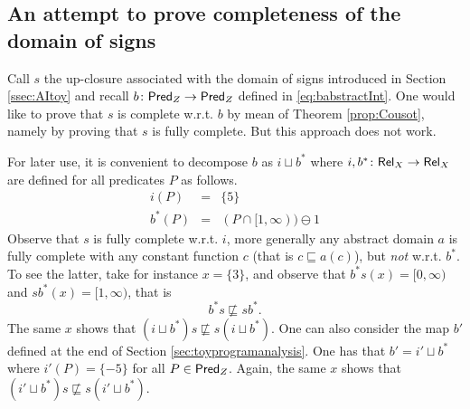 \documentclass{llncs}
\begin{document}
\subsection{An attempt to prove completeness of the domain of signs}\label{sec:Signcomplete}
Call $s$ the up-closure associated with the domain of signs introduced in Section \ref{ssec:AItoy} and recall $b\colon \mathsf{Pred}_Z \to \mathsf{Pred}_Z$ defined in \eqref{eq:babstractInt}. One would like to prove that $s$ is complete w.r.t. $b$ by mean of Theorem \ref{prop:Cousot}, namely by proving that $s$ is fully complete. But this approach does not work.


For later use, it is convenient to decompose $b$ as $i \sqcup b^*$ where $i,b^* \colon \mathsf{Rel}_X\to  \mathsf{Rel}_X$ are defined for all predicates $P$ as follows.
\begin{equation}\label{eq:toyif}
\begin{array}{rcl}
i(P) & = & \{ 5 \}\\
b^*(P) & =& (P\cap [1,\infty) ) \ominus\! 1 
\end{array}
\end{equation}
Observe that $s$ is fully complete w.r.t. $i$, more generally any abstract domain $a$ is fully complete with any constant function $c$ (that is $c\sqsubseteq a(c)$), but \emph{not} w.r.t. $b^*$. To see the latter, take for instance $x=\{3\}$, and observe that $b^*s(x)=[0, \infty)$ and $sb^*(x)=[1,\infty)$, that is 
\begin{equation}\label{eq:notfc}
b^*s \not \sqsubseteq sb^*\text{.}
\end{equation}
The same $x$ shows that $(i\sqcup b^*)s \not \sqsubseteq s(i\sqcup b^*)$. One can also consider the map $b'$ defined at the end of Section \ref{sec:toyprogramanalysis}. One has that $b' =i' \sqcup b^*$ where $i'(P)=\{-5\}$ for all $P\in \mathsf{Pred}_Z$. Again, the same $x$ shows that $(i'\sqcup b^*)s \not \sqsubseteq s(i'\sqcup b^*)$.
%
%
%
%
\end{document}
